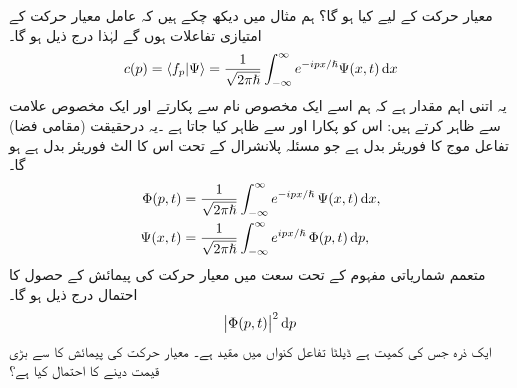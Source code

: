 معیار حرکت کے لیے کیا ہو گا؟ ہم مثال  میں دیکھ چکے ہیں کہ عامل معیار حرکت کے امتیازی تفاعلات  ہوں گے لہٰذا درج ذیل ہو گا۔
\begin{align}
c(p) = \langle f_{p} | \Psi \rangle = \frac{1}{\sqrt{2\pi\hslash}} \int_{-\infty}^{\infty} e^{-ipx/\hslash} \Psi (x,t)\dif x
\end{align}
یہ اتنی اہم مقدار ہے کہ ہم اسے ایک مخصوص نام سے پکارتے اور ایک مخصوص علامت سے ظاہر کرتے ہیں: اس کو پکارا اور  سے ظاہر کیا جاتا ہے ۔یہ درحقیقت (مقامی فضا) تفاعل موج  کا فوریئر بدل ہے جو مسئلہ پلانشرال کے تحت اس کا الٹ فوریئر بدل ہے ہو گا۔
\begin{align}\label{مساوات_قواعد_معیار_حرکت_فضا_تفاعل_موج}
\Phi(p,t) &= \frac{1}{\sqrt{2\pi\hslash}} \int_{-\infty}^{\infty} e^{-ipx/\hslash}\, \Psi (x,t) \dif x, \\ 
\Psi(x,t) &= \frac{1}{\sqrt{2\pi\hslash}} \int_{-\infty}^{\infty} e^{ipx/\hslash}\, \Phi (p,t) \dif p,
\end{align}
متعمم شماریاتی مفہوم کے تحت سعت  میں معیار حرکت کی پیمائش کے حصول کا احتمال درج ذیل ہو گا۔ 
\begin{align}
\abs{ \Phi(p,t)}^{2}\dif p
\end{align}
 ایک ذرہ جس کی کمیت  ہے ڈیلٹا تفاعل کنواں  میں مقید ہے۔ معیار حرکت کی پیمائش کا  سے بڑی قیمت دینے کا احتمال کیا ہے؟ 
 
